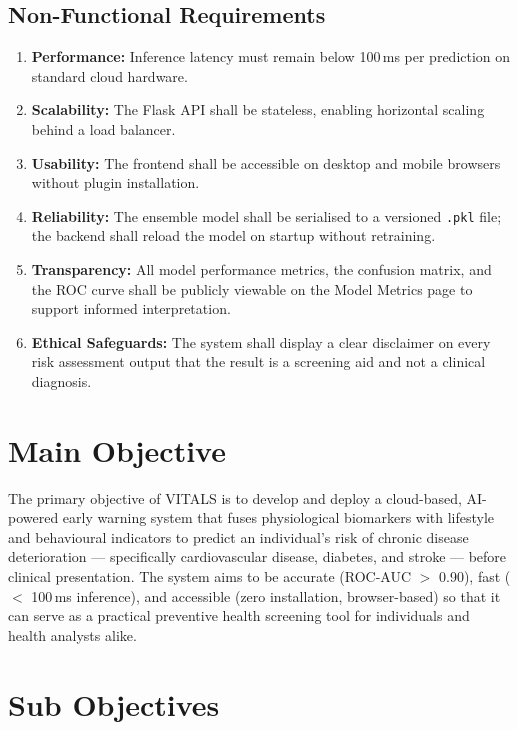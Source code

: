 \documentclass[12pt,a4paper]{report}
\begin{document}
\subsection{Non-Functional Requirements}

\begin{enumerate}[leftmargin=*]
  \item \textbf{Performance:} Inference latency must remain below 100\,ms per prediction on standard cloud hardware.
  \item \textbf{Scalability:} The Flask API shall be stateless, enabling horizontal scaling behind a load balancer.
  \item \textbf{Usability:} The frontend shall be accessible on desktop and mobile browsers without plugin installation.
  \item \textbf{Reliability:} The ensemble model shall be serialised to a versioned \texttt{.pkl} file; the backend shall reload the model on startup without retraining.
  \item \textbf{Transparency:} All model performance metrics, the confusion matrix, and the ROC curve shall be publicly viewable on the Model Metrics page to support informed interpretation.
  \item \textbf{Ethical Safeguards:} The system shall display a clear disclaimer on every risk assessment output that the result is a screening aid and not a clinical diagnosis.
\end{enumerate}

\section{Main Objective}

The primary objective of VITALS is to develop and deploy a cloud-based, AI-powered early warning system that fuses physiological biomarkers with lifestyle and behavioural indicators to predict an individual's risk of chronic disease deterioration — specifically cardiovascular disease, diabetes, and stroke — before clinical presentation. The system aims to be accurate (ROC-AUC $>$ 0.90), fast ($<$ 100\,ms inference), and accessible (zero installation, browser-based) so that it can serve as a practical preventive health screening tool for individuals and health analysts alike.

\section{Sub Objectives}
\end{document}
